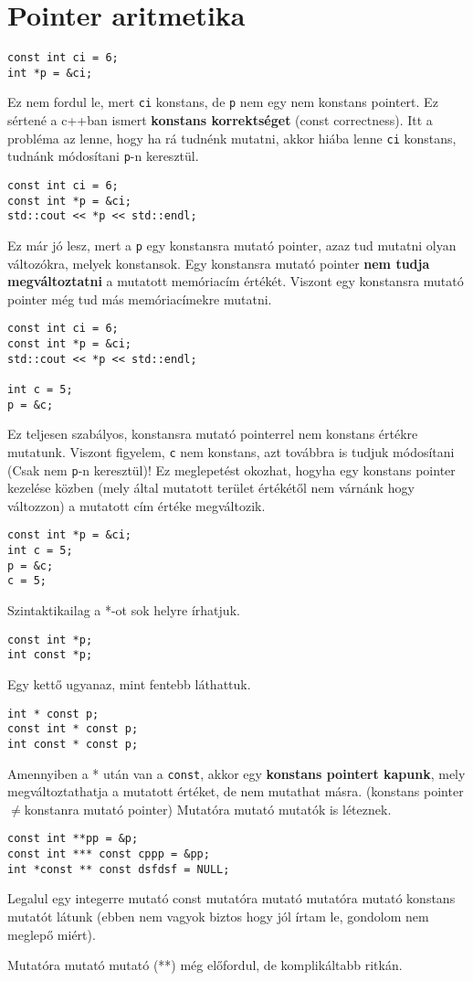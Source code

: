 \documentclass[a4paper,11.5pt]{article}
\begin{document}
	\section{Pointer aritmetika}
		\begin{lstlisting}
const int ci = 6;
int *p = &ci;
		\end{lstlisting}
		Ez nem fordul le, mert \texttt{ci} konstans, de \texttt{p} nem egy nem konstans pointert. Ez sértené a c++ban ismert \textbf{konstans korrektséget} (const correctness). Itt a probléma az lenne, hogy ha rá tudnénk mutatni, akkor hiába lenne \texttt{ci} konstans, tudnánk módosítani \texttt{p}-n keresztül.
		\begin{lstlisting}
const int ci = 6;
const int *p = &ci;
std::cout << *p << std::endl;
		\end{lstlisting}
		Ez már jó lesz, mert a \texttt{p} egy konstansra mutató pointer, azaz tud mutatni olyan változókra, melyek konstansok. Egy konstansra mutató pointer \textbf{nem tudja megváltoztatni} a mutatott memóriacím értékét. Viszont egy konstansra mutató pointer még tud más memóriacímekre mutatni.
		\begin{lstlisting}
const int ci = 6;
const int *p = &ci;
std::cout << *p << std::endl;

int c = 5;
p = &c;
		\end{lstlisting}
		Ez teljesen szabályos, konstansra mutató pointerrel nem konstans értékre mutatunk. Viszont figyelem, \texttt{c} nem konstans, azt továbbra is tudjuk módosítani (Csak nem \texttt{p}-n keresztül)! Ez meglepetést okozhat, hogyha egy konstans pointer kezelése közben (mely által mutatott terület értékétől nem várnánk hogy változzon) a mutatott cím értéke megváltozik.
		\begin{lstlisting}
const int *p = &ci;
int c = 5;
p = &c;
c = 5;
		\end{lstlisting}
		Szintaktikailag a *-ot sok helyre írhatjuk.
		\begin{lstlisting}
const int *p;
int const *p;
		\end{lstlisting}
		Egy kettő ugyanaz, mint fentebb láthattuk.
		\begin{lstlisting}
int * const p;
const int * const p;
int const * const p;
		\end{lstlisting} 
		Amennyiben a * után van a \texttt{const}, akkor egy \textbf{konstans pointert kapunk}, mely megváltoztathatja a mutatott értéket, de nem mutathat másra. (konstans pointer \quad $\not=$\quad konstanra mutató pointer)
		Mutatóra mutató mutatók is léteznek.
		\begin{lstlisting}
const int **pp = &p;
const int *** const cppp = &pp;
int *const ** const dsfdsf = NULL;
		\end{lstlisting}
		Legalul egy integerre mutató const mutatóra mutató mutatóra mutató konstans mutatót látunk (ebben nem vagyok biztos hogy jól írtam le, gondolom nem meglepő miért).
	\begin{note}
		Mutatóra mutató mutató (**) még előfordul, de komplikáltabb ritkán.
	\end{note}
\end{document}
